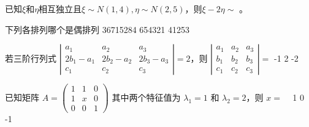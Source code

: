 \documentclass[noanswer]{USTBExam}
\begin{document}

\begin{problem}
  已知$\xi$和$\eta$相互独立且$\xi\sim N(1,4), \eta\sim N(2,5)$，则$\xi-2\eta\sim$ 。
\end{problem}




\begin{problem}
  下列各排列哪个是偶排列 
    {36715284}
    {654321}
    {41253}
\end{problem}


\begin{problem}
  若三阶行列式 $\left|
    \begin{array}{ccc}
      a_1         & a_2         & a_3         \\
      2 b_1 - a_1 & 2 b_2 - a_2 & 2 b_3 - a_3 \\
      c_1         & c_2         & c_3
    \end{array}
    \right| = 2$，则 $\left|
    \begin{array}{ccc}
      a_1 & a_2 & a_3 \\
      b_1 & b_2 & b_3 \\
      c_1 & c_2 & c_3
    \end{array}
    \right|=$ 
    {-1}
    {2}
    {-2}
\end{problem}


\begin{problem}
  已知矩阵 $A = \left(
      \begin{array}{ccc}
          1 & 1 & 0 \\
          1 & x & 0 \\
          0 & 0 & 1
        \end{array}
      \right)$ 其中两个特征值为 $\lambda_1 = 1$ 和 $\lambda_2
    = 2$，则 $x=$ ~
    {1}
    {0}
    {-1}
\end{problem}

\end{document}
